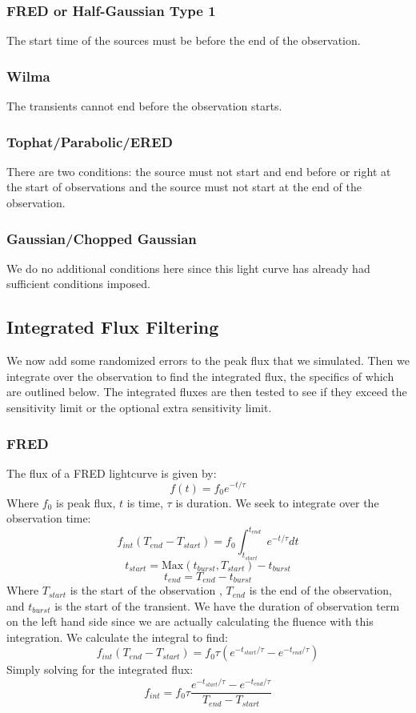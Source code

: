 \documentclass{article}
\begin{document}
\subsubsection{FRED or Half-Gaussian Type 1}
The start time of the sources must be before the end of the observation.
\subsubsection{Wilma}
The transients cannot end before the observation starts.
\subsubsection{Tophat/Parabolic/ERED}
There are two conditions: the source must not start and end before or right at the start of observations and the source must not start at the end of the observation.
\subsubsection{Gaussian/Chopped Gaussian}
We do no additional conditions here since this light curve has already had sufficient conditions imposed.
\subsection{Integrated Flux Filtering}
We now add some randomized errors to the peak flux that we simulated. Then we integrate over the observation to find the integrated flux, the specifics of which are outlined below. The integrated fluxes are then tested to see if they exceed the sensitivity limit or the optional extra sensitivity limit. 
\subsubsection{FRED}
The flux of a FRED lightcurve is given by:
\[f(t)=f_0e^{-t/\tau}\]
Where $f_0$ is peak flux, $t$ is time, $\tau$ is duration. We seek to integrate over the observation time:
\[f_{int}(T_{end}-T_{start}) = f_0\int_{t_{start}}^{t_{end}}e^{-t/\tau}dt\]
\[t_{start} = \text{Max}(t_{burst}, T_{start}) - t_{burst}\]
\[t_{end} = T_{end} - t_{burst}\]
Where $T_{start}$ is the start  of the observation , $T_{end}$ is the end of the observation, and $t_{burst}$ is the start of the transient. We have the duration of observation term on the left hand side since we are actually calculating the fluence with this integration. We calculate the integral to find:
\[f_{int}(T_{end}-T_{start}) = f_0\tau (e^{-t_{start}/\tau}-e^{-t_{end}/\tau})\]
Simply solving for the integrated flux:
\[f_{int} = f_0\tau \frac{e^{-t_{start}/\tau}-e^{-t_{end}/\tau}}{T_{end}-T_{start}}\]
\end{document}

